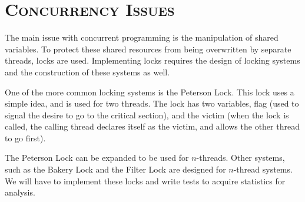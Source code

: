 \documentclass[finalProject.tex]{subfiles}
\begin{document}
\bigskip

\section*{\textsc{\Large Concurrency Issues}}
	
	The main issue with concurrent programming is the manipulation of shared variables.  To protect these shared resources from being overwritten by separate threads, locks are used.  Implementing locks requires the design of locking systems and the construction of these systems as well.  
	
	One of the more common locking systems is the Peterson Lock.  This lock uses a simple idea, and is used for two threads.  The lock has two variables, flag (used to signal the desire to go to the critical section), and the victim (when the lock is called, the calling thread declares itself as the victim, and allows the other thread to go first).  
	
	The Peterson Lock can be expanded to be used for $n$-threads.  Other systems, such as the Bakery Lock and the Filter Lock are designed for $n$-thread systems.  We will have to implement these locks and write tests to acquire statistics for analysis.
\end{document}
